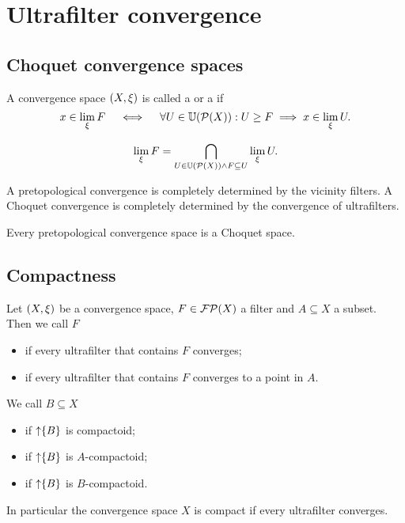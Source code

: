 \chapter{Ultrafilter convergence}
\section{Choquet convergence spaces}
\begin{definition}
A convergence space $\left( X, \xi \right)$ is called a  or a  if
\[ x\in \lim_\xi F \quad\iff\quad \forall U\in \operatorname{\mathbb{U}}(\operatorname{\mathcal{P}}(X)): U \geq F \implies x\in\lim_\xi U. \]
\end{definition}

\[ \lim_\xi F = \bigcap_{U\in \operatorname{\mathbb{U}}(\operatorname{\mathcal{P}}(X))\land F \subseteq U}\lim_\xi U. \]

A pretopological convergence is completely determined by the vicinity filters. A Choquet convergence is completely determined by the convergence of ultrafilters.

\begin{lemma}
Every pretopological convergence space is a Choquet space.
\end{lemma}

\section{Compactness}
\begin{definition}
Let $\left( X,\xi \right)$ be a convergence space, $F\in\operatorname{\mathcal{FP}}(X)$ a filter and $A\subseteq X$ a subset. Then we call $F$
\begin{itemize}
\item {} if every ultrafilter that contains $F$ converges;
\item {} if every ultrafilter that contains $F$ converges to a point in $A$.
\end{itemize}
We call $B\subseteq X$
\begin{itemize}
\item {} if $\operatorname{\uparrow}\{B\}$ is compactoid;
\item {} if $\operatorname{\uparrow}\{B\}$ is $A$-compactoid;
\item {} if $\operatorname{\uparrow}\{B\}$ is $B$-compactoid.
\end{itemize}
\end{definition}
In particular the convergence space $X$ is compact if every ultrafilter converges.

